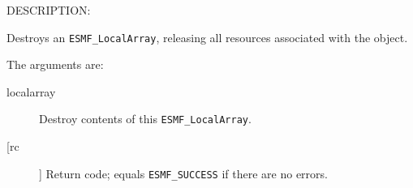 {\sf DESCRIPTION:\\ }


   Destroys an {\tt ESMF\_LocalArray}, releasing all resources associated
   with the object.
  
   The arguments are:
   \begin{description}
   \item[localarray]
   Destroy contents of this {\tt ESMF\_LocalArray}.
   \item[[rc]]
   Return code; equals {\tt ESMF\_SUCCESS} if there are no errors.
   \end{description}
  
\setlength{\parskip}{\oldparskip}
\setlength{\parindent}{\oldparindent}
\setlength{\baselineskip}{\oldbaselineskip}
